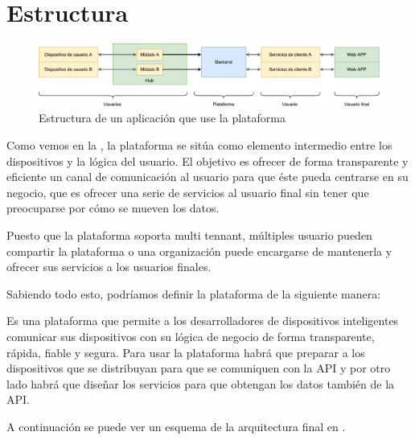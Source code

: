 \section{Estructura}

\begin{figure}[htbp]
\centering
\includegraphics[width=\linewidth]{02-arquitectura/figuras/fig001}
\caption{Estructura de un aplicación que use la plataforma}
\label{fig:figura1}
\end{figure}

Como vemos en la , la plataforma se sitúa como elemento intermedio entre
los dispositivos y la lógica del usuario. El objetivo es ofrecer de forma
transparente y eficiente un canal de comunicación al usuario para que éste pueda
centrarse en su negocio, que es ofrecer una serie de servicios al usuario final
sin tener que preocuparse por cómo se mueven los datos.

Puesto que la plataforma soporta multi tennant, múltiples usuario pueden
compartir la plataforma o una organización puede encargarse de mantenerla y
ofrecer sus servicios a los usuarios finales.

Sabiendo todo esto, podríamos definir la plataforma de la siguiente manera:

Es una plataforma que permite a los desarrolladores de dispositivos inteligentes
comunicar sus dispositivos con su lógica de negocio de forma transparente,
rápida, fiable y segura.
Para usar la plataforma habrá que preparar a los dispositivos que se distribuyan
para que se comuniquen con la API y por otro lado habrá que diseñar los
servicios para que obtengan los datos también de la API.

A continuación se puede ver un esquema de la arquitectura final en .

